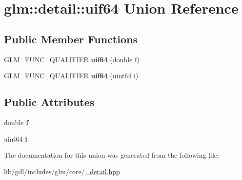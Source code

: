 \hypertarget{unionglm_1_1detail_1_1uif64}{}\section{glm\+:\+:detail\+:\+:uif64 Union Reference}
\label{unionglm_1_1detail_1_1uif64}
\subsection*{Public Member Functions}
\begin{DoxyCompactItemize}
\item 
\hypertarget{unionglm_1_1detail_1_1uif64_a811b699ddc7ad7d8fd2a5d7124ec2ca2}{}G\+L\+M\+\_\+\+F\+U\+N\+C\+\_\+\+Q\+U\+A\+L\+I\+F\+I\+E\+R {\bfseries uif64} (double f)\label{unionglm_1_1detail_1_1uif64_a811b699ddc7ad7d8fd2a5d7124ec2ca2}

\item 
\hypertarget{unionglm_1_1detail_1_1uif64_ac81669b0cdc1ee96b079ee04eef05a36}{}G\+L\+M\+\_\+\+F\+U\+N\+C\+\_\+\+Q\+U\+A\+L\+I\+F\+I\+E\+R {\bfseries uif64} (uint64 i)\label{unionglm_1_1detail_1_1uif64_ac81669b0cdc1ee96b079ee04eef05a36}

\end{DoxyCompactItemize}
\subsection*{Public Attributes}
\begin{DoxyCompactItemize}
\item 
\hypertarget{unionglm_1_1detail_1_1uif64_aab66f17623b23da00e1a3dc0c0b8b85c}{}double {\bfseries f}\label{unionglm_1_1detail_1_1uif64_aab66f17623b23da00e1a3dc0c0b8b85c}

\item 
\hypertarget{unionglm_1_1detail_1_1uif64_a198f5a44e3d46830cb49381bacbb28a5}{}uint64 {\bfseries i}\label{unionglm_1_1detail_1_1uif64_a198f5a44e3d46830cb49381bacbb28a5}

\end{DoxyCompactItemize}


The documentation for this union was generated from the following file\+:\begin{DoxyCompactItemize}
\item 
lib/gdl/includes/glm/core/\hyperlink{__detail_8hpp}{\+\_\+detail.\+hpp}\end{DoxyCompactItemize}
